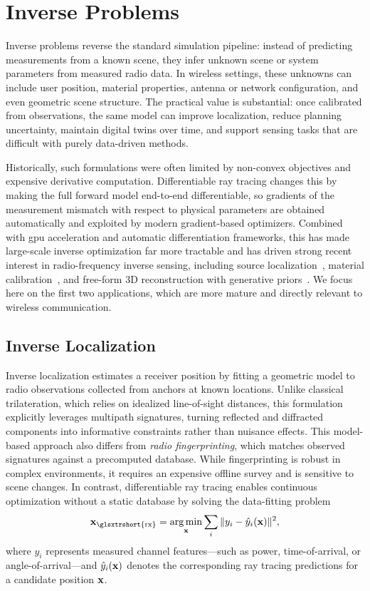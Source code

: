 \section{Inverse Problems}

Inverse problems reverse the standard simulation pipeline: instead of predicting measurements from a known scene, they infer unknown scene or system parameters from measured radio data. In wireless settings, these unknowns can include user position, material properties, antenna or network configuration, and even geometric scene structure. The practical value is substantial: once calibrated from observations, the same model can improve localization, reduce planning uncertainty, maintain digital twins over time, and support sensing tasks that are difficult with purely data-driven methods.

Historically, such formulations were often limited by non-convex objectives and expensive derivative computation. Differentiable ray tracing changes this by making the full forward model end-to-end differentiable, so gradients of the measurement mismatch with respect to physical parameters are obtained automatically and exploited by modern gradient-based optimizers. Combined with \gls{gpu} acceleration and automatic differentiation frameworks, this has made large-scale inverse optimization far more tractable and has driven strong recent interest in radio-frequency inverse sensing, including source localization~, material calibration~, and free-form 3D reconstruction with generative priors~. We focus here on the first two applications, which are more mature and directly relevant to wireless communication.

\subsection{Inverse Localization}

Inverse localization estimates a receiver position by fitting a geometric model to radio observations collected from anchors at known locations. Unlike classical trilateration, which relies on idealized \gls{line-of-sight} distances, this formulation explicitly leverages multipath signatures, turning reflected and diffracted components into informative constraints rather than nuisance effects. This model-based approach also differs from \emph{radio fingerprinting}, which matches observed signatures against a precomputed database. While fingerprinting is robust in complex environments, it requires an expensive offline survey and is sensitive to scene changes. In contrast, differentiable ray tracing enables continuous optimization without a static database by solving the data-fitting problem
\begin{equation}
  \bsup{x}_\text{\glsxtrshort{rx}} = \argmin_{\bsup{x}} \sum_i \|y_i - \hat{y}_i(\bsup{x})\|^2,
\end{equation}
where $y_i$ represents measured channel features---such as power, time-of-arrival, or angle-of-arrival---and $\hat{y}_i(\mathbf{x})$ denotes the corresponding ray tracing predictions for a candidate position $\mathbf{x}$.

